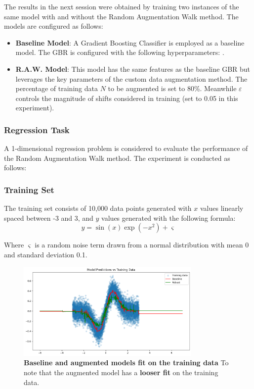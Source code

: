 The results in the next session were obtained by training two instances of the same model with and without the Random Augmentation Walk method. The models are configured as follows:
\begin{itemize}
    \item \textbf{Baseline Model}: A Gradient Boosting Classifier is employed as a baseline model. The GBR is configured with the following hyperparameters: .
    \item \textbf{R.A.W. Model}: This model has the same features as the baseline GBR but leverages the key parameters of the custom data augmentation method. The percentage of training data $N$ to be augmented is set to 80\%. Meanwhile $\varepsilon$ controls the magnitude of shifts considered in training (set to 0.05 in this experiment).
\end{itemize}






\subsubsection{\textbf{Regression Task}}

A 1-dimensional regression problem is considered to evaluate the performance of the Random Augmentation Walk method. The experiment is conducted as follows:

\subsubsection{Training Set}
The training set consists of 10,000 data points generated with $x$ values linearly spaced between -3 and 3, and $y$ values generated with the following formula:
\begin{equation}
    y = \sin(x)\exp(-x^2) + \varsigma
\end{equation}

Where $\varsigma$ is a random noise term drawn from a normal distribution with mean 0 and standard deviation 0.1.

\begin{figure}[H]
    \centering
    \includegraphics[width=0.8\textwidth]{assets/fit_on_train.png} 
    \caption{\textbf{Baseline and augmented models fit on the training data} To note that the augmented model has a \textbf{looser fit} on the training data.}
    \label{fig:fit-train}
\end{figure}


